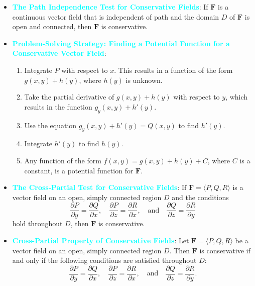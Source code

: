 \documentclass{report}
\begin{document}
\begin{itemize}
        \item \textbf{\textcolor{cyan}{The Path Independence Test for Conservative Fields}}:
            If $\mathbf{F}$ is a continuous vector field that is independent of path and the domain $D$ of $\mathbf{F}$ is open and connected, then $\mathbf{F}$ is conservative.
        \item \textbf{\textcolor{cyan}{Problem-Solving Strategy: Finding a Potential Function for a Conservative Vector Field}}:
            \begin{enumerate}
                \item Integrate \( P \) with respect to \( x \). This results in a function of the form \( g(x,y) + h(y) \), where \( h(y) \) is unknown.
                \item Take the partial derivative of \( g(x,y) + h(y) \) with respect to \( y \), which results in the function \( g_y(x,y) + h'(y) \).
                \item Use the equation \( g_y(x,y) + h'(y) = Q(x,y) \) to find \( h'(y) \).
                \item Integrate \( h'(y) \) to find \( h(y) \).
                \item Any function of the form \( f(x,y) = g(x,y) + h(y) + C \), where \( C \) is a constant, is a potential function for \( \mathbf{F} \).
            \end{enumerate}
        \item \textbf{\textcolor{cyan}{The Cross-Partial Test for Conservative Fields}}:
            If \( \mathbf{F} = \langle P, Q, R \rangle \) is a vector field on an open, simply connected region \( D \) and the conditions 
            \[
                \frac{\partial P}{\partial y} = \frac{\partial Q}{\partial x}, \quad \frac{\partial P}{\partial z} = \frac{\partial R}{\partial x}, \quad \text{and} \quad \frac{\partial Q}{\partial z} = \frac{\partial R}{\partial y}
            \]
            hold throughout \( D \), then \( \mathbf{F} \) is conservative.
        \item \textbf{\textcolor{cyan}{Cross-Partial Property of Conservative Fields}}:
            Let \( \mathbf{F} = \langle P, Q, R \rangle \) be a vector field on an open, simply connected region \( D \). Then \( \mathbf{F} \) is conservative if and only if the following conditions are satisfied throughout \( D \):
            \[
                \frac{\partial P}{\partial y} = \frac{\partial Q}{\partial x}, \quad \frac{\partial P}{\partial z} = \frac{\partial R}{\partial x}, \quad \text{and} \quad \frac{\partial Q}{\partial z} = \frac{\partial R}{\partial y}.
\]
\end{itemize}
\end{document}
